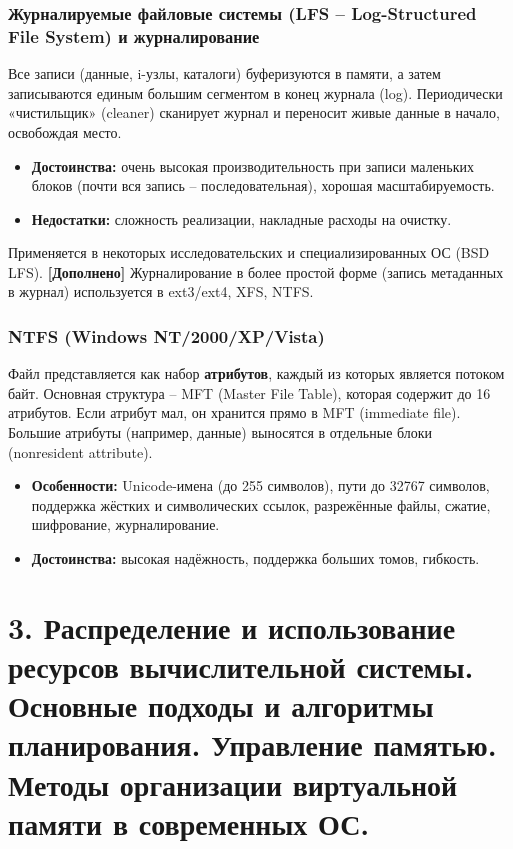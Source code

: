 \documentclass[a4paper,12pt]{article}
\begin{document}
\subsubsection{Журналируемые файловые системы (LFS – Log-Structured File System) и журналирование}
Все записи (данные, i-узлы, каталоги) буферизуются в памяти, а затем записываются единым большим сегментом в конец журнала (log). Периодически «чистильщик» (cleaner) сканирует журнал и переносит живые данные в начало, освобождая место.
\begin{itemize}
    \item \textbf{Достоинства:} очень высокая производительность при записи маленьких блоков (почти вся запись – последовательная), хорошая масштабируемость.
    \item \textbf{Недостатки:} сложность реализации, накладные расходы на очистку.
\end{itemize}
Применяется в некоторых исследовательских и специализированных ОС (BSD LFS). \textbf{[Дополнено]} Журналирование в более простой форме (запись метаданных в журнал) используется в ext3/ext4, XFS, NTFS.

\subsubsection{NTFS (Windows NT/2000/XP/Vista)}
Файл представляется как набор \textbf{атрибутов}, каждый из которых является потоком байт. Основная структура – MFT (Master File Table), которая содержит до 16 атрибутов. Если атрибут мал, он хранится прямо в MFT (immediate file). Большие атрибуты (например, данные) выносятся в отдельные блоки (nonresident attribute). 
\begin{itemize}
    \item \textbf{Особенности:} Unicode-имена (до 255 символов), пути до 32767 символов, поддержка жёстких и символических ссылок, разрежённые файлы, сжатие, шифрование, журналирование.
    \item \textbf{Достоинства:} высокая надёжность, поддержка больших томов, гибкость.
\end{itemize}

\section*{3. Распределение и использование ресурсов вычислительной системы. Основные подходы и алгоритмы планирования. Управление памятью. Методы организации виртуальной памяти в современных ОС.}
\end{document}
